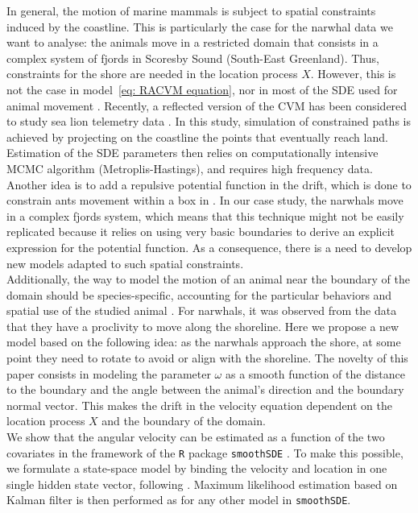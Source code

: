 \documentclass[11pt]{article}
\newcommand {\1}{\mathbb{1}}
\begin{document}
In general, the motion of marine mammals is subject to spatial constraints induced by the coastline. This is particularly the case for the narwhal data we want to analyse: the animals move in a restricted domain that consists in a complex system of fjords in Scoresby Sound (South-East Greenland). Thus, constraints for the shore are needed in the location process $X$. However, this is not the case in model~\ref{eq: RACVM equation}, nor in most of the SDE used for animal movement \cite{johnson_continuoustime_2008,michelot_varying-coefficient_2021,gurarie_correlated_2017}. 
Recently, a reflected version of the CVM has been considered to study sea lion telemetry data \cite{hanks_reflected_2017}.
In this study, simulation of constrained paths is achieved by projecting on the coastline the  points that eventually reach land. Estimation of the SDE parameters then relies on computationally intensive MCMC algorithm (Metroplis-Hastings), and requires high frequency data. Another idea is to add a repulsive potential function in the drift, which is done to constrain ants movement within a box in \cite{russell_spatially_2018}. In our case study, the narwhals move in a complex fjords system, which means that this technique might not be easily replicated because it relies on using very basic boundaries to derive an explicit expression for the potential function. As a consequence, there is a need to develop new models adapted to such spatial constraints.\\
Additionally, the way to model the motion of an animal near the boundary of the domain should be species-specific, accounting for the particular behaviors and spatial use of the studied animal \cite{brillinger_simulating_2003}. For narwhals, it was observed from the data that they have a proclivity to move along the shoreline. Here we propose a new model based on the following idea: as the narwhals approach the shore, at some point they need to rotate to avoid or align with the shoreline. The novelty of this paper consists in modeling the parameter $\omega$ as a smooth function of the distance to the boundary and the angle between the animal's direction and the boundary normal vector. This makes the drift in the velocity equation dependent on the location process $X$ and the boundary of the domain.  \\ %
We show that the angular velocity  can be estimated as a function of the two covariates in the framework of the \texttt{R} package \texttt{smoothSDE} \cite{michelot_varying-coefficient_2021}. To make this possible, we formulate a state-space model by binding the velocity and location in one single hidden state vector, following \cite{johnson_continuoustime_2008}. Maximum likelihood estimation based on Kalman filter is then performed as for any other model in \texttt{smoothSDE}.\\
\end{document}
